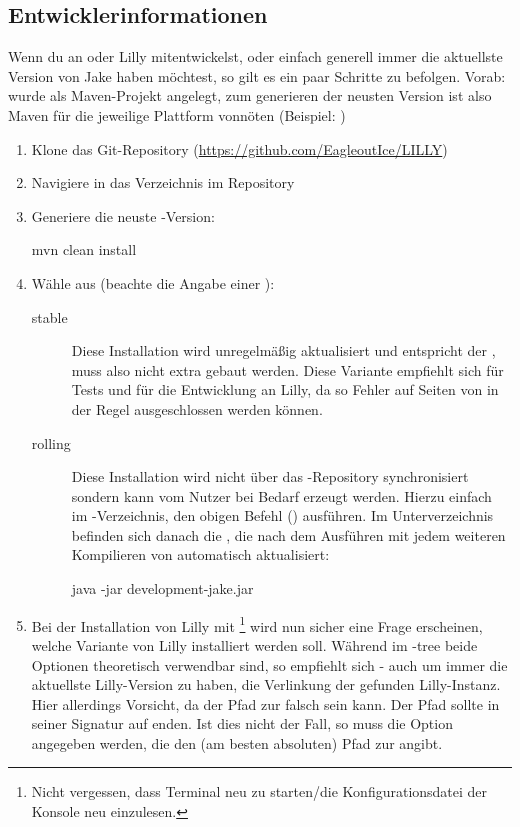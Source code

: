 \subsection{Entwicklerinformationen}
Wenn du an \Jake oder Lilly mitentwickelst, oder einfach generell immer die aktuellste Version von Jake haben möchtest, so gilt es ein paar Schritte zu befolgen. Vorab: \Jake wurde als Maven-Projekt angelegt, zum generieren der neusten Version ist also Maven für die jeweilige Plattform vonnöten (Beispiel: )
\begin{enumerate}\narrowitems
    \item Klone das Git-Repository (\url{https://github.com/EagleoutIce/LILLY})
    \item Navigiere in das Verzeichnis  im Repository
    \item Generiere die neuste \Jake-Version: \begin{bash*}
mvn clean install
        \end{bash*}
    \item Wähle aus (beachte die Angabe einer ): \begin{description}
        \item[stable] Diese Installation wird unregelmäßig aktualisiert und entspricht der , muss also nicht extra gebaut werden. Diese Variante empfiehlt sich für Tests und für die Entwicklung an Lilly, da so Fehler auf Seiten von \Jake in der Regel ausgeschlossen werden können.
        \item[rolling] Diese Installation wird nicht über das -Repository synchronisiert sondern kann vom Nutzer bei Bedarf erzeugt werden. Hierzu einfach im -Verzeichnis, den obigen Befehl () ausführen. Im Unterverzeichnis  befinden sich danach die , die nach dem Ausführen mit jedem weiteren Kompilieren von \Jake automatisch aktualisiert: \begin{bash*}
java -jar development-jake.jar 
        \end{bash*}
    \end{description}
    \item Bei der Installation von Lilly mit \footnote{Nicht vergessen, dass Terminal neu zu starten/die Konfigurationsdatei der Konsole neu einzulesen.} wird nun sicher eine Frage erscheinen, welche Variante von Lilly installiert werden soll. Während im -tree beide Optionen theoretisch verwendbar sind, so empfiehlt sich - auch um immer die aktuellste Lilly-Version zu haben, die Verlinkung der gefunden Lilly-Instanz. Hier allerdings Vorsicht, da der Pfad zur  falsch sein kann. Der Pfad sollte in seiner Signatur auf  enden. Ist dies nicht der Fall, so muss die Option  angegeben werden, die den (am besten absoluten) Pfad zur  angibt. 
\end{enumerate}

